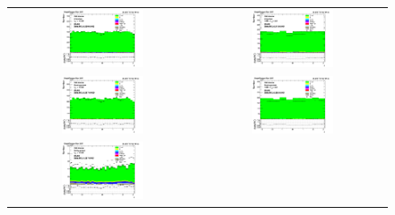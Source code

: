\begin{figure}[htp]
  \begin{center}
    \begin{tabular}{cc}
      \includegraphics[width=0.45\textwidth]{figures/Zprime/2017/ScaleFactor/SameSign/nominal/stack_phi_Barrel_probes_PUW.png} &
      \includegraphics[width=0.45\textwidth]{figures/Zprime/2017/ScaleFactor/SameSign/nominal/stack_phi_Endcap_probes_PUW.png} \\
      \includegraphics[width=0.45\textwidth]{figures/Zprime/2017/ScaleFactor/SameSign/nominal/stack_phi_Barrel_pass_PUW.png} &
      \includegraphics[width=0.45\textwidth]{figures/Zprime/2017/ScaleFactor/SameSign/nominal/stack_phi_Endcap_pass_PUW.png}\\
      \includegraphics[width=0.45\textwidth]{figures/Zprime/2017/ScaleFactor/SameSign/nominal/stack_phi_Barrel_fail_PUW.png} &

\end{tabular}
\end{center}
\end{figure}
